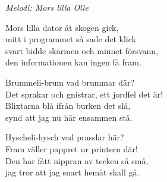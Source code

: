 {\footnotesize\textit{Melodi: Mors lilla Olle}}\par
\vspace{10pt}
Mors lilla dator åt skogen gick,\\
mitt i programmet så sade det klick\\
svart bidde skärmen och minnet försvann,\\
den informationen kan ingen få fram.\par
\vspace{10pt}
Brummeli-brum vad brummar där?\\
Det sprakar och gnistrar, ett jordfel det är!\\
Blixtarna blå ifrån burken det slå,\\
synd att jag nu här ensammen stå.\par
\vspace{10pt}
Hyscheli-hysch vad prasslar här?\\
Fram väller pappret ur printern där!\\
Den har fått nippran av tecken så små,\\
jag tror att jag snart hemåt skall gå.
